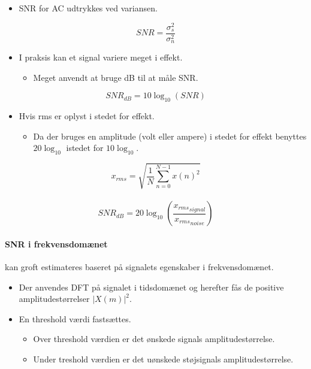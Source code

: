 \documentclass[danish]{article}
\begin{document}
\begin{itemize}
	\item SNR for AC udtrykkes ved variansen.
\end{itemize}

\begin{equation}
SNR = \frac{{\sigma}_s^2}{{\sigma}_n^2}
\end{equation}

\begin{itemize}
	\item I praksis kan et signal variere meget i effekt.
	\begin{itemize}
		\item Meget anvendt at bruge dB til at måle SNR.
	\end{itemize}
\end{itemize}

\begin{equation}
SNR_{dB} = 10 {\log}_{10}(SNR)
\end{equation}

\begin{itemize}
	\item Hvis rms er oplyst i stedet for effekt.
	\begin{itemize}
		\item Da der bruges en amplitude (volt eller ampere) i stedet for effekt benyttes $ 20 {\log}_{10}$ istedet for $ 10 {\log}_{10}$.
	\end{itemize}
\end{itemize}

\begin{equation}
x_{rms} = \sqrt{\frac{1}{N} \sum_{n=0}^{N-1}x(n)^2}
\end{equation}
­
\begin{equation}
SNR_{dB} = 20 {\log}_{10}\left(\frac{{x_{rms}}_{signal}}{{x_{rms}}_{noise}}\right)
\end{equation}


\paragraph{SNR i frekvensdomænet} kan groft estimateres baseret på signalets egenskaber i frekvensdomænet.

\begin{itemize}
	\item Der anvendes DFT på signalet i tidsdomænet og herefter fås de positive amplitudestørrelser $|X(m)|^2$.
	\item En threshold værdi fastsættes.
	\begin{itemize}
		\item Over threshold værdien er det ønskede signals amplitudestørrelse.
		\item Under treshold værdien er det uønskede støjsignals amplitudestørrelse.
	\end{itemize}
\end{itemize}
\end{document}
